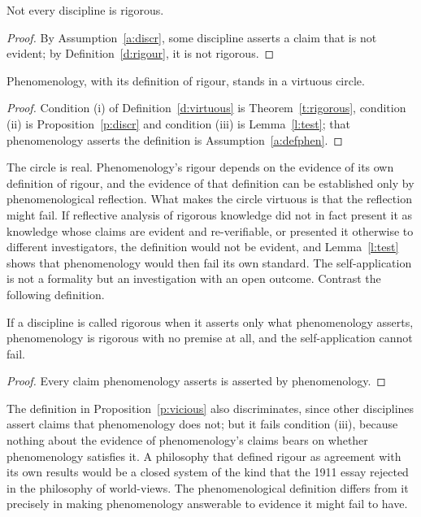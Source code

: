 \documentclass{situationist-preprint}
\begin{document}
\begin{proposition}\label{p:discr}
Not every discipline is rigorous.
\end{proposition}

\begin{proof}
By Assumption~\ref{a:discr}, some discipline asserts a claim that is not evident; by Definition~\ref{d:rigour}, it is not rigorous.
\end{proof}

\begin{theorem}\label{t:virtuous}
Phenomenology, with its definition of rigour, stands in a virtuous circle.
\end{theorem}

\begin{proof}
Condition (i) of Definition~\ref{d:virtuous} is Theorem~\ref{t:rigorous}, condition (ii) is Proposition~\ref{p:discr} and condition (iii) is Lemma~\ref{l:test}; that phenomenology asserts the definition is Assumption~\ref{a:defphen}.
\end{proof}

The circle is real. Phenomenology's rigour depends on the evidence of its own definition of rigour, and the evidence of that definition can be established only by phenomenological reflection. What makes the circle virtuous is that the reflection might fail. If reflective analysis of rigorous knowledge did not in fact present it as knowledge whose claims are evident and re-verifiable, or presented it otherwise to different investigators, the definition would not be evident, and Lemma~\ref{l:test} shows that phenomenology would then fail its own standard. The self-application is not a formality but an investigation with an open outcome. Contrast the following definition.

\begin{proposition}\label{p:vicious}
If a discipline is called rigorous when it asserts only what phenomenology asserts, phenomenology is rigorous with no premise at all, and the self-application cannot fail.
\end{proposition}

\begin{proof}
Every claim phenomenology asserts is asserted by phenomenology.
\end{proof}

The definition in Proposition~\ref{p:vicious} also discriminates, since other disciplines assert claims that phenomenology does not; but it fails condition (iii), because nothing about the evidence of phenomenology's claims bears on whether phenomenology satisfies it. A philosophy that defined rigour as agreement with its own results would be a closed system of the kind that the 1911 essay rejected in the philosophy of world-views. The phenomenological definition differs from it precisely in making phenomenology answerable to evidence it might fail to have.
\end{document}
